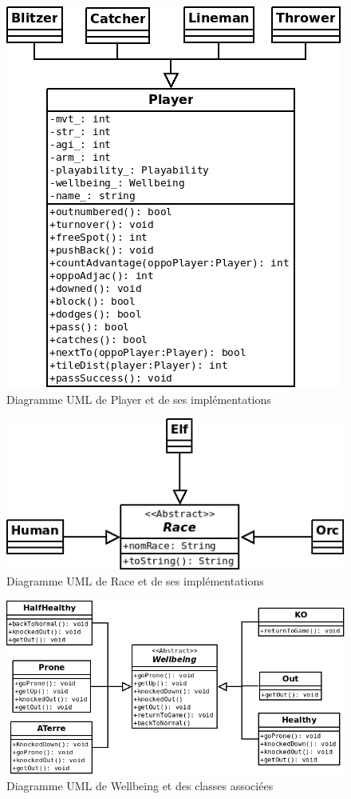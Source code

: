 \documentclass{article}
\begin{document}
    \begin{figure}[H]
        \centerline{\includegraphics[scale=0.5]{img/Player.png}}
        \caption{\label{DiaPlayer} Diagramme UML de Player et de ses implémentations}
    \end{figure}
    
    \begin{figure}[H]
        \centerline{\includegraphics[scale=0.5]{img/Race.png}}
        \caption{\label{DiaRace} Diagramme UML de Race et de ses implémentations}
    \end{figure}
    
    \begin{figure}[H]
        \includegraphics[scale=0.5]{img/WellbeingState.png}
        \caption{\label{DiaWellbeingState} Diagramme UML de Wellbeing et des classes associées}
    \end{figure}
    
\end{document}
